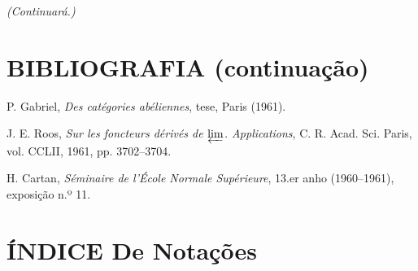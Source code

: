 \bigskip
\noindent\emph{(Continuará.)}

\clearpage
\thispagestyle{empty}
\null
\clearpage
\thispagestyle{plain}

\section*{BIBLIOGRAFIA (continuação)}

\begin{flushleft}
[27] P. Gabriel, \emph{Des catégories abéliennes}, tese, Paris (1961).

\medskip
[28] J. E. Roos, \emph{Sur les foncteurs dérivés de $\varprojlim$.
Applications}, C. R. Acad. Sci. Paris, vol. CCLII, 1961, pp. 3702--3704.

\medskip
[29] H. Cartan, \emph{Séminaire de l'École Normale Supérieure},
13.er anho (1960--1961), exposição n.º 11.
\end{flushleft}

\clearpage
{}
\section*{ÍNDICE De Notações}

